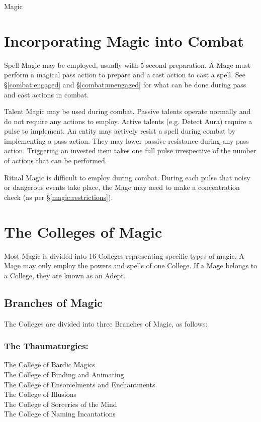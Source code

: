 \begin{Chapter}{Magic}
\section{Incorporating Magic into Combat}
\label{magic:combat}

Spell Magic may be employed, usually with 5 second preparation. A Mage
must perform a magical pass action to prepare and a cast action to
cast a spell. See \S\ref{combat:engaged} and \S\ref{combat:unengaged}
for what can be done during pass and cast actions in combat.

Talent Magic may be used during combat. Passive talents operate
normally and do not require any actions to employ. Active talents
(e.g. Detect Aura) require a pulse to implement.  An entity may
actively resist a spell during combat by implementing a pass action.
They may lower passive resistance during any pass action. Triggering
an invested item takes one full pulse irrespective of the number of
actions that can be performed.

Ritual Magic is difficult to employ during combat.  During each pulse
that noisy or dangerous events take place, the Mage may need to make a
concentration check (as per \S\ref{magic:restrictions}).


\section{The Colleges of Magic}
\label{magic:colleges}

Most Magic is divided into 16 Colleges representing specific types of
magic.  A Mage may only employ the powers and spells of one College.
If a Mage belongs to a College, they are known as an Adept.

\subsection{Branches of Magic}

The Colleges are divided into three Branches of Magic, as follows:

\subsubsection{The Thaumaturgies:}
The College of Bardic Magics \\
The College of Binding and Animating \\
The College of Ensorcelments and Enchantments \\
The College of Illusions \\
The College of Sorceries of the Mind \\
The College of Naming Incantations 


\end{Chapter}
